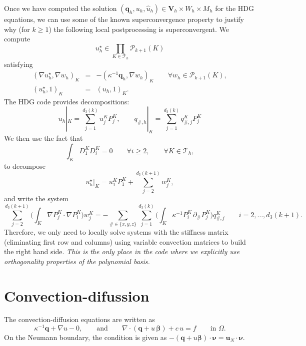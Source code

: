 \documentclass[10pt,english]{article}
\begin{document}
Once we have computed the solution $(\boldsymbol q_h,u_h,\widehat u_h)\in \boldsymbol V_h\times W_h\times M_h$ for the HDG equations, we can use some of the known superconvergence property to justify why (for $k\ge 1$) the following local postprocessing is superconvergent. We compute
\[
u_h^\star\in \prod_{K\in \mathcal T_h}\mathcal P_{k+1}(K)
\]
satisfying
\begin{eqnarray*}
(\nabla u_h^\star,\nabla w_h)_K &=& -(\kappa^{-1}\boldsymbol q_h,\nabla w_h)_K \qquad  \forall w_h \in \mathcal P_{k+1}(K),\\
(u_h^\star,1)_K &=&(u_h,1)_K.
\end{eqnarray*}
The HDG code provides decompositions:
\[
u_h|_K=\sum_{j=1}^{d_3(k)} u_j^K P_j^K, \qquad q_{\#,h}|_K =\sum_{j=1}^{d_3(k)} q_{\#,j}^K P_j^K
\]
We then use the fact that
\[
\int_K D_1^K D_i^K = 0 \qquad \forall i\ge 2, \qquad \forall K\in \mathcal T_h,
\]
to decompose
\[
u_h^\star|_K = u_1^K P_1^K+ \sum_{j=2}^{d_3(k+1)} w_j^K,
\]
and write the system
\[
\sum_{j=2}^{d_3(k+1)} \Big( \int_K \nabla P_j^K \cdot \nabla P_i^K\Big) w_j^K = -\sum_{\#\in \{x,y,z\}}\sum_{j=1}^{d_3(k)}\Big( \int_K \kappa^{-1}  
P_i^K\, \partial_{\#} P_j^K\Big) q_{\#,j}^K \qquad i=2,\ldots,d_3(k+1).
\]
Therefore, we only need to locally solve systems with the stiffness matrix (eliminating first row and columns) using variable convection matrices to build the right hand side.
{\em This is the only place in the code where we explicitly use orthogonality properties of the polynomial basis.} 




\section{Convection-difussion}
 The convection-diffusion equations are written as
\[
\kappa^{-1} \boldsymbol q+\nabla u -0, \qquad \mbox{and} \qquad \nabla\cdot(\boldsymbol q+u\,\boldsymbol\beta)+c\,u=f \qquad \mbox{in $\Omega$}. 
\]
On the Neumann boundary, the condition is given as $-(\boldsymbol q + u\boldsymbol\beta)\cdot\boldsymbol\nu=\boldsymbol u_N\cdot\boldsymbol\nu$.
\end{document}
